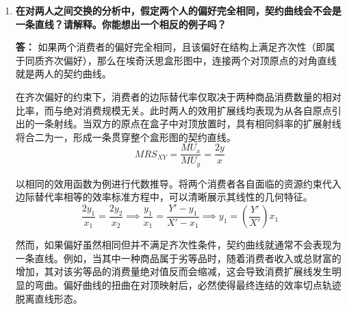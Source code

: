 \begin{enumerate}[label=\textbf{\arabic*.}, leftmargin=*]
\begin{center}
		\end{center}
		
		\item \textbf{在对两人之间交换的分析中，假定两个人的偏好完全相同，契约曲线会不会是一条直线？请解释。你能想出一个相反的例子吗？}
		
		\textbf{答：}
		如果两个消费者的偏好完全相同，且该偏好在结构上满足齐次性（即属于同质齐次偏好），那么在埃奇沃思盒形图中，连接两个对顶原点的对角直线就是两人的契约曲线。
		
		在齐次偏好的约束下，消费者的边际替代率仅取决于两种商品消费数量的相对比率，而与绝对消费规模无关。此时两人的效用扩展线均表现为从各自原点引出的一条射线。当双方的原点在盒子中对顶放置时，具有相同斜率的扩展射线将合二为一，形成一条贯穿整个盒形图的契约直线。
		\[
		MRS_{XY} = \frac{MU_x}{MU_y} = \frac{2y}{x}
		\]
		
		以相同的效用函数为例进行代数推导。将两个消费者各自面临的资源约束代入边际替代率相等的效率标准方程中，可以清晰展示其线性的几何特征。
		\[
		\frac{2y_1}{x_1} = \frac{2y_2}{x_2} \implies \frac{y_1}{x_1} = \frac{Y' - y_1}{X' - x_1} \implies y_1 = \left(\frac{Y'}{X'}\right) x_1
		\]
		
		然而，如果偏好虽然相同但并不满足齐次性条件，契约曲线就通常不会表现为一条直线。例如，当其中一种商品属于劣等品时，随着消费者收入或总财富的增加，其对该劣等品的消费量绝对值反而会缩减，这会导致消费扩展线发生明显的弯曲。偏好曲线的扭曲在对顶映射后，必然使得最终连结的效率切点轨迹脱离直线形态。
		

\end{enumerate}
